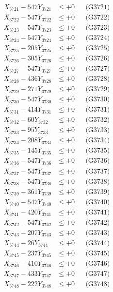 \documentclass[a4paper,10pt]{article}
\begin{document}
{\begin{align}
\allowbreak
X_{3721} - 547Y_{3721} &\leq +0 && \text{(G3721)} \\
X_{3722} - 547Y_{3722} &\leq +0 && \text{(G3722)} \\
X_{3723} - 547Y_{3723} &\leq +0 && \text{(G3723)} \\
X_{3724} - 547Y_{3724} &\leq +0 && \text{(G3724)} \\
X_{3725} - 205Y_{3725} &\leq +0 && \text{(G3725)} \\
X_{3726} - 305Y_{3726} &\leq +0 && \text{(G3726)} \\
X_{3727} - 547Y_{3727} &\leq +0 && \text{(G3727)} \\
X_{3728} - 436Y_{3728} &\leq +0 && \text{(G3728)} \\
X_{3729} - 271Y_{3729} &\leq +0 && \text{(G3729)} \\
X_{3730} - 547Y_{3730} &\leq +0 && \text{(G3730)} \\
\allowbreak
X_{3731} - 414Y_{3731} &\leq +0 && \text{(G3731)} \\
X_{3732} - 60Y_{3732} &\leq +0 && \text{(G3732)} \\
X_{3733} - 95Y_{3733} &\leq +0 && \text{(G3733)} \\
X_{3734} - 208Y_{3734} &\leq +0 && \text{(G3734)} \\
X_{3735} - 145Y_{3735} &\leq +0 && \text{(G3735)} \\
X_{3736} - 547Y_{3736} &\leq +0 && \text{(G3736)} \\
X_{3737} - 547Y_{3737} &\leq +0 && \text{(G3737)} \\
X_{3738} - 547Y_{3738} &\leq +0 && \text{(G3738)} \\
X_{3739} - 361Y_{3739} &\leq +0 && \text{(G3739)} \\
X_{3740} - 547Y_{3740} &\leq +0 && \text{(G3740)} \\
\allowbreak
X_{3741} - 420Y_{3741} &\leq +0 && \text{(G3741)} \\
X_{3742} - 547Y_{3742} &\leq +0 && \text{(G3742)} \\
X_{3743} - 207Y_{3743} &\leq +0 && \text{(G3743)} \\
X_{3744} - 26Y_{3744} &\leq +0 && \text{(G3744)} \\
X_{3745} - 237Y_{3745} &\leq +0 && \text{(G3745)} \\
X_{3746} - 410Y_{3746} &\leq +0 && \text{(G3746)} \\
X_{3747} - 433Y_{3747} &\leq +0 && \text{(G3747)} \\
X_{3748} - 222Y_{3748} &\leq +0 && \text{(G3748)} \\

\end{align}}
\end{document}
